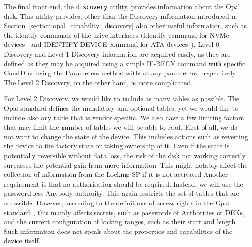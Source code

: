 The final front end, the \verb|discovery| utility, provides information about the Opal disk.
This utility provides, other than the Discovery information introduced in Section~\ref{section:opal_capability_discovery} also other useful information, such as the identify commands of the drive interfaces (Identify command for NVMe devices~\cite{nvme-express-base-specification} and IDENTIFY DEVICE command for ATA devices~\cite{acs-3}).
Level 0 Discovery and Level 1 Discovery information are acquired easily, as they are defined as they may be acquired using a simple IF-RECV command with specific ComID %
or using the Parameters method without any parameters, respectively.
The Level 2 Discovery, on the other hand, is more complicated.

For Level 2 Discovery, we would like to include as many tables as possible. The Opal standard defines the mandatory and optional tables, yet we would like to include also any table that is vendor specific.
We also have a few limiting factors that may limit the number of tables we will be able to read.
First of all, we do not want to change the state of the device. This includes actions such as reverting the device to the factory state or taking ownership of it. Even if the state is potentially reversible without data loss, the risk of the disk not working correctly surpasses the potential gain from more information. This might notably affect the collection of information from the Locking SP if it is not activated
Another requirement is that no authorisation should be required. Instead, we will use the password-less Anybody authority. This again restricts the set of tables that are accessible. However, according to the definitions of access rights in the Opal standard~\cite{tcg-opal2}, this mainly affects secrets, such as passwords of Authorities or DEKs, and the current configuration of locking ranges, such as their start and length. Such information does not speak about the properties and capabilities of the device itself.

